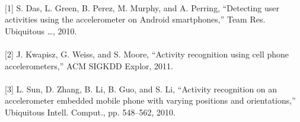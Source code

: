 \documentclass[11pt,letterpaper]{article}
\newcommand{\blue}[1]{\textcolor{RoyalBlue}{#1}}
\newcommand{\instructions}[1]{\blue{\textit{#1}}}
\begin{document}
\paragraph{}
[1] S. Das, L. Green, B. Perez, M. Murphy, and A. Perring, “Detecting user activities using the accelerometer on Android smartphones,” Team Res. Ubiquitous …, 2010.
\paragraph{}
[2] J. Kwapisz, G. Weiss, and S. Moore, “Activity recognition using cell phone accelerometers,” ACM SIGKDD Explor, 2011.
\paragraph{}
[3] L. Sun, D. Zhang, B. Li, B. Guo, and S. Li, “Activity recognition on an accelerometer embedded mobile phone with varying positions and orientations,” Ubiquitous Intell. Comput., pp. 548–562, 2010.
%  
%



%   
 
\end{document}
